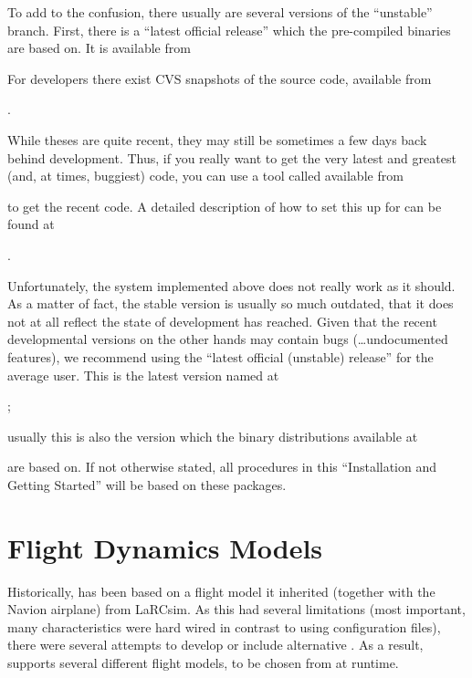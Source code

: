 To add to the confusion, there usually are several versions of the ``unstable''
branch. First, there is a ``latest official release'' which the pre-compiled binaries are based
on.  It is available from
\medskip

\medskip

For developers there exist CVS snapshots of the
source code, available from
 \medskip

.
 \medskip

 \noindent
While theses are quite recent, they may still be sometimes a few days back behind
development. Thus, if you really want to get the very latest and greatest (and, at times,
buggiest) code, you can use a tool called 
available from
 \medskip

 \medskip

 \noindent
to get the recent code. A detailed description of how to set this up for \FlightGear{}
can be found at
 \medskip

.
 \medskip

 \noindent
 Unfortunately, the system implemented above does not really work as it should. As a matter of
 fact, the stable version is usually so much outdated, that it does not at all reflect the state
 of development \FlightGear{} has reached. Given that the recent developmental versions on the
 other hands may contain bugs (\ldots undocumented features), we recommend using the
 ``latest official (unstable) release'' for the average user. This is the latest version named at

 ;
 \medskip

\noindent
 usually this is also the version which the binary distributions
 available at
 \medskip

 \medskip

 \noindent
 are based on. If not otherwise stated, all procedures in this ``Installation and Getting Started''
 will be based on these packages.

\section{Flight Dynamics Models\label{flight models}}
Historically, \FlightGear{} has been based on a flight model it inherited (together
with the Navion airplane) from LaRCsim. As this had several limitations (most important,
many characteristics were hard wired in contrast to using configuration files), there were
several attempts to develop or include alternative . As a result,
\FlightGear{} supports several different flight models, to be chosen from at runtime.


